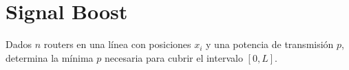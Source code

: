 \documentclass{article}
\begin{document}
\section*{Signal Boost}
Dados $n$ routers en una l\'inea con posiciones $x_i$ y una potencia de transmisi\'on $p$, determina la m\'inima $p$ necesaria para cubrir el intervalo $[0,L]$.
\end{document}

